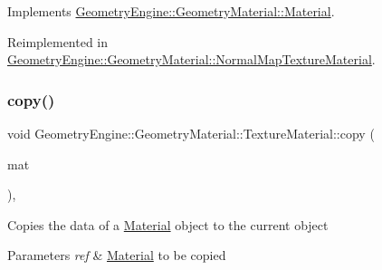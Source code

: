 Implements \mbox{\hyperlink{class_geometry_engine_1_1_geometry_material_1_1_material_ae5513ff06d536365e18ddc5e07e79784}{Geometry\+Engine\+::\+Geometry\+Material\+::\+Material}}.



Reimplemented in \mbox{\hyperlink{class_geometry_engine_1_1_geometry_material_1_1_normal_map_texture_material_a3a3d1f16cf175f084bc3eeab56f6e42f}{Geometry\+Engine\+::\+Geometry\+Material\+::\+Normal\+Map\+Texture\+Material}}.

\mbox{\label{class_geometry_engine_1_1_geometry_material_1_1_texture_material_a946658ad56ad140e6e5ec5d12a15affc}} 
\subsubsection{\texorpdfstring{copy()}{copy()}}
{\footnotesize\ttfamily void Geometry\+Engine\+::\+Geometry\+Material\+::\+Texture\+Material\+::copy (\begin{DoxyParamCaption}\item[{const \mbox{\hyperlink{class_geometry_engine_1_1_geometry_material_1_1_texture_material}{Texture\+Material}} \&}]{mat }\end{DoxyParamCaption})\hspace{0.3cm}{\ttfamily [protected]}, {\ttfamily [virtual]}}

Copies the data of a \mbox{\hyperlink{class_geometry_engine_1_1_geometry_material_1_1_material}{Material}} object to the current object 
\begin{DoxyParams}{Parameters}
{\em ref} & \mbox{\hyperlink{class_geometry_engine_1_1_geometry_material_1_1_material}{Material}} to be copied \\
\hline
\end{DoxyParams}
\mbox{\label{class_geometry_engine_1_1_geometry_material_1_1_texture_material_a7bb3c956fa64e47b251d882890c931f9}} 
